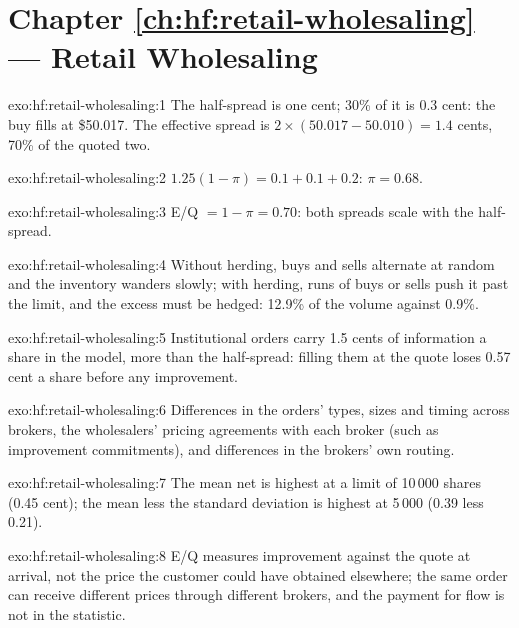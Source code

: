 \section*{Chapter \ref{ch:hf:retail-wholesaling} --- Retail Wholesaling}

\begin{solution}{exo:hf:retail-wholesaling:1}
The half-spread is one cent; 30\% of it is 0.3 cent: the buy fills at \$50.017. The effective spread is $2\times(50.017-50.010)=1.4$ cents, 70\% of
the quoted two.
\end{solution}

\begin{solution}{exo:hf:retail-wholesaling:2}
$1.25(1-\pi)=0.1+0.1+0.2$: $\pi=0.68$.
\end{solution}

\begin{solution}{exo:hf:retail-wholesaling:3}
E/Q $=1-\pi=0.70$: both spreads scale with the half-spread.
\end{solution}

\begin{solution}{exo:hf:retail-wholesaling:4}
Without herding, buys and sells alternate at random and the inventory wanders slowly; with herding, runs of buys or sells push it past the limit, and
the excess must be hedged: 12.9\% of the volume against 0.9\%.
\end{solution}

\begin{solution}{exo:hf:retail-wholesaling:5}
Institutional orders carry 1.5 cents of information a share in the model, more than the half-spread: filling them at the quote loses 0.57 cent a
share before any improvement.
\end{solution}

\begin{solution}{exo:hf:retail-wholesaling:6}
Differences in the orders' types, sizes and timing across brokers, the wholesalers' pricing agreements with each broker (such as improvement
commitments), and differences in the brokers' own routing.
\end{solution}

\begin{solution}{exo:hf:retail-wholesaling:7}
The mean net is highest at a limit of 10\,000 shares (0.45 cent); the mean less the standard deviation is highest at 5\,000 (0.39 less 0.21).
\end{solution}

\begin{solution}{exo:hf:retail-wholesaling:8}
E/Q measures improvement against the quote at arrival, not the price the customer could have obtained elsewhere; the same order can receive different
prices through different brokers, and the payment for flow is not in the statistic.
\end{solution}


